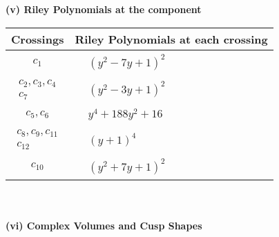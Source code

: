 \documentclass[1p]{elsarticle_modified}
\theoremstyle{definition}
\begin{document}
\newpage\renewcommand{\arraystretch}{1}
\flushleft \textbf{(v) Riley Polynomials at the component}\newline \\
\begin{tabular}{m{50pt}|m{274pt}}
Crossings & \hspace{64pt}Riley Polynomials at each crossing \\
\hline $$\begin{aligned}c_{1}\end{aligned}$$&$\begin{aligned}
&(y^2-7 y+1)^2
\end{aligned}$\\
\hline $$\begin{aligned}c_{2},c_{3},c_{4}\\c_{7}\end{aligned}$$&$\begin{aligned}
&(y^2-3 y+1)^2
\end{aligned}$\\
\hline $$\begin{aligned}c_{5},c_{6}\end{aligned}$$&$\begin{aligned}
&y^4+188 y^2+16
\end{aligned}$\\
\hline $$\begin{aligned}c_{8},c_{9},c_{11}\\c_{12}\end{aligned}$$&$\begin{aligned}
&(y+1)^4
\end{aligned}$\\
\hline $$\begin{aligned}c_{10}\end{aligned}$$&$\begin{aligned}
&(y^2+7 y+1)^2
\end{aligned}$\\
\hline
\end{tabular}\\~\\
\newpage\flushleft \textbf{(vi) Complex Volumes and Cusp Shapes}
\end{document}
